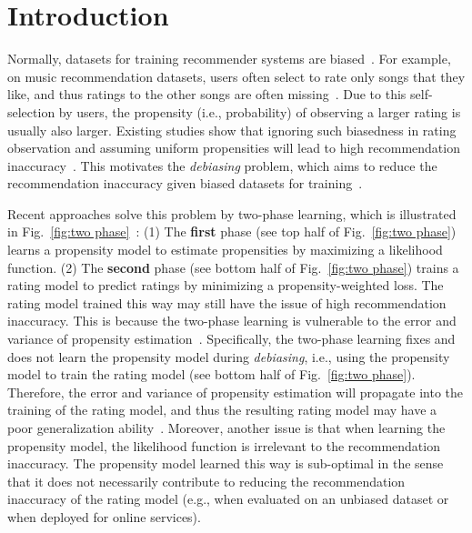 \documentclass[letterpaper]{article} %
\begin{document}
\section{Introduction}
Normally, datasets for training recommender systems are biased~\cite{wang2018modeling}.
For example, on music recommendation datasets, users often select to rate only songs that they like, and thus ratings to the other songs are often missing~\cite{ling2012response}.
Due to this self-selection by users, the propensity (i.e., probability) of observing a larger rating is usually also larger.
Existing studies show that ignoring such biasedness in rating observation and assuming uniform propensities will lead to high recommendation inaccuracy~\cite{marlin2007collaborative}.
This motivates the \emph{debiasing} problem, which aims to reduce the recommendation inaccuracy given biased datasets for training~\cite{marlin2009collaborative}.

Recent approaches solve this problem by two-phase learning, which is illustrated in Fig.~\ref{fig:two phase}~\cite{schnabel2016recommendations,wang2019doubly}:
(1) The \textbf{first} phase (see top half of Fig.~\ref{fig:two phase}) learns a propensity model to estimate propensities by maximizing a likelihood function.
(2) The \textbf{second} phase (see bottom half of Fig.~\ref{fig:two phase}) trains a rating model to predict ratings by minimizing a propensity-weighted loss.
The rating model trained this way may still have the issue of high recommendation inaccuracy.
This is because the two-phase learning is vulnerable to the error and variance of propensity estimation~\cite{schnabel2016recommendations}.
Specifically, the two-phase learning fixes and does not learn the propensity model during \emph{debiasing}, i.e., using the propensity model to train the rating model (see bottom half of Fig.~\ref{fig:two phase}).
Therefore, the error and variance of propensity estimation will propagate into the training of the rating model, and thus the resulting rating model may have a poor generalization ability~\cite{wang2019doubly}.
Moreover, another issue is that when learning the propensity model, the likelihood function is irrelevant to the recommendation inaccuracy.
The propensity model learned this way is sub-optimal in the sense that it does not necessarily contribute to reducing the recommendation inaccuracy of the rating model (e.g., when evaluated on an unbiased dataset or when deployed for online services).
\end{document}
